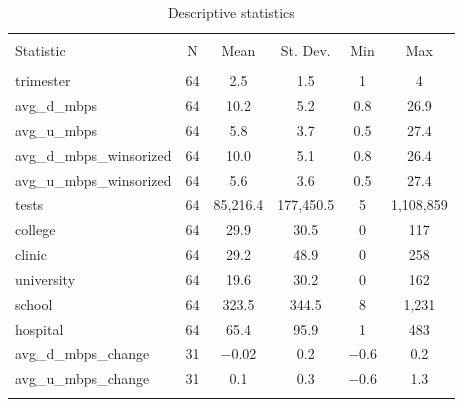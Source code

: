 
\begin{table}[!htbp] \centering 
  \caption{Descriptive statistics} 
  \label{} 
\begin{tabular}{@{\extracolsep{5pt}}lccccc} 
\\[-1.8ex]\hline 
\hline \\[-1.8ex] 
Statistic & \multicolumn{1}{c}{N} & \multicolumn{1}{c}{Mean} & \multicolumn{1}{c}{St. Dev.} & \multicolumn{1}{c}{Min} & \multicolumn{1}{c}{Max} \\ 
\hline \\[-1.8ex] 
trimester & 64 & 2.5 & 1.5 & 1 & 4 \\ 
avg\_d\_mbps & 64 & 10.2 & 5.2 & 0.8 & 26.9 \\ 
avg\_u\_mbps & 64 & 5.8 & 3.7 & 0.5 & 27.4 \\ 
avg\_d\_mbps\_winsorized & 64 & 10.0 & 5.1 & 0.8 & 26.4 \\ 
avg\_u\_mbps\_winsorized & 64 & 5.6 & 3.6 & 0.5 & 27.4 \\ 
tests & 64 & 85,216.4 & 177,450.5 & 5 & 1,108,859 \\ 
college & 64 & 29.9 & 30.5 & 0 & 117 \\ 
clinic & 64 & 29.2 & 48.9 & 0 & 258 \\ 
university & 64 & 19.6 & 30.2 & 0 & 162 \\ 
school & 64 & 323.5 & 344.5 & 8 & 1,231 \\ 
hospital & 64 & 65.4 & 95.9 & 1 & 483 \\ 
avg\_d\_mbps\_change & 31 & $-$0.02 & 0.2 & $-$0.6 & 0.2 \\ 
avg\_u\_mbps\_change & 31 & 0.1 & 0.3 & $-$0.6 & 1.3 \\ 
\hline \\[-1.8ex] 
\end{tabular} 
\end{table} 

